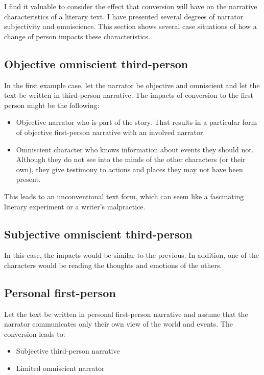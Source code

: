 I find it valuable to consider the effect that conversion will have on the narrative characteristics of a literary text. I have presented several degrees of narrator subjectivity and omniscience. This section shows several case situations of how a change of person impacts these characteristics.

\subsection*{Objective omniscient third-person}

In the first example case, let the narrator be objective and omniscient and let the text be written in third-person narrative. The impacts of conversion to the first person might be the following:

\begin{itemize}
	\item Objective narrator who is part of the story. That results in a particular form of objective first-person narrative with an involved narrator.
	\item Omniscient character who knows information about events they should not. Although they do not see into the minds of the other characters (or their own), they give testimony to actions and places they may not have been present.
\end{itemize}

This leads to an unconventional text form, which can seem like a fascinating literary experiment or a writer's malpractice.

\subsection*{Subjective omniscient third-person}

In this case, the impacts would be similar to the previous. In addition, one of the characters would be reading the thoughts and emotions of the others.

\subsection*{Personal first-person}

Let the text be written in personal first-person narrative and assume that the narrator communicates only their own view of the world and events. The conversion leads to:

\begin{itemize}
	\item Subjective third-person narrative
	\item Limited omniscient narrator
\end{itemize}

